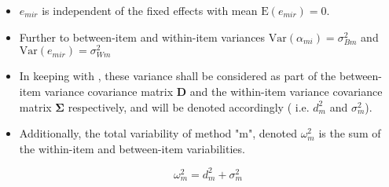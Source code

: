 \begin{itemize}
  \item $e_{mir}$ is independent of the fixed effects with mean $\mbox{E}(e_{mir}) = 0$.
  \item Further to \citet{barnhart} between-item and within-item variances $\mbox{Var}(\alpha_{mi}) = \sigma^2_{Bm}$ and $\mbox{Var}(e_{mir}) = \sigma^2_{Wm}$
  \item In keeping with \citet{Roy}, these variance shall be considered as part of the between-item variance covariance matrix $\boldsymbol{D}$ and the within-item variance covariance matrix  $\boldsymbol{\Sigma}$
        respectively, and will be denoted accordingly ( i.e. $d^2_{m}$ and $\sigma^2_{m}$).
 \item Additionally, the total variability of method "m", denoted $\omega^2_m$ is the sum of the within-item and between-item variabilities.

    \[ \omega^2_m = d^2_{m}+ \sigma^2_{m} \]

\end{itemize}
\newpage
